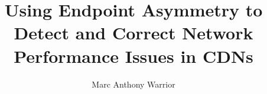 \documentclass[10pt]{ClemsonProposal}
\title{Using Endpoint Asymmetry to Detect and Correct Network Performance Issues in CDNs}
\author{Marc Anthony Warrior}
\begin{document}
    \begin{frontmatter}
        \maketitle
		\tableofcontents
        \newpage

        
	\end{frontmatter}



    \doublespacing     %
    \pagestyle{fancy}  %

    
    
    
    
    



\end{document}
